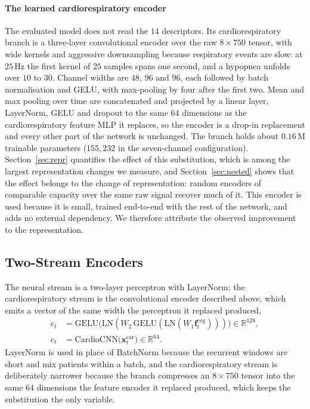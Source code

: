 \documentclass{ieeeaccess}
\begin{document}
\paragraph{The learned cardiorespiratory encoder}
The evaluated model does not read the $14$ descriptors. Its cardiorespiratory branch is a
three-layer convolutional encoder over the raw $8\times750$ tensor, with wide kernels and
aggressive downsampling because respiratory events are slow: at $25$\,Hz the first kernel of
$25$ samples spans one second, and a hypopnea unfolds over $10$ to $30$. Channel widths are
$48$, $96$ and $96$, each followed by batch normalisation and GELU, with max-pooling by four
after the first two. Mean and max pooling over time are concatenated and projected by a
linear layer, LayerNorm, GELU and dropout to the same
$64$ dimensions as the cardiorespiratory feature MLP it replaces, so the encoder is a drop-in replacement and every
other part of the network is unchanged. The branch holds about $0.16$\,M trainable
parameters ($155{,}232$ in the seven-channel configuration). Section~\ref{sec:repr} quantifies the
effect of this substitution, which is among the
largest representation changes we measure, and
Section~\ref{sec:nested} shows that the effect belongs to the change of
representation: random encoders of comparable capacity
over the same raw signal recover much of it. This encoder is used because it is small,
trained end-to-end with the rest of the network, and adds no external dependency. We
therefore attribute the observed improvement to the representation.

\subsection{Two-Stream Encoders}
The neural stream is a two-layer perceptron with LayerNorm; the
cardiorespiratory stream is the convolutional encoder described above, which emits a vector
of the same width the perceptron it replaced produced,
\begin{align}
e_t&=\mathrm{GELU}\!\big(\mathrm{LN}(W_2\,\mathrm{GELU}(\mathrm{LN}(W_1\mathbf{f}^{\mathrm{eeg}}_t))) \big)\in\mathbb{R}^{128},\\
c_t&=\mathrm{CardioCNN}\big(\mathbf{x}^{\mathrm{car}}_t\big)\in\mathbb{R}^{64}.
\end{align}
LayerNorm is used in place of BatchNorm because the recurrent windows are short and mix
patients within a batch, and the cardiorespiratory stream is deliberately narrower because
the branch compresses an $8\times750$ tensor into the same $64$ dimensions the
feature encoder it replaced produced, which keeps the substitution the only variable.
\end{document}
